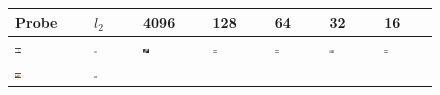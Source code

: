 \begin{figure}[t]
    \begin{center}
        \begin{tabu} to \textwidth {|X[c]|X[c]|X[c]X[c]X[c]X[c]X[c]|}
           \hline
            Probe & $l_2$ & 4096 & 128 & 64 & 32 & 16 \\ \hline \hline
            \includegraphics[width=0.1\textwidth]{images/ret_results/0/probe.png} & 
            \includegraphics[width=0.1\textwidth]{images/ret_results/0/l2.png} & 
            \includegraphics[width=0.1\textwidth]{images/ret_results/0/4096.png} &
            \includegraphics[width=0.1\textwidth]{images/ret_results/0/128.png} &
            \includegraphics[width=0.1\textwidth]{images/ret_results/0/64.png} & 
            \includegraphics[width=0.1\textwidth]{images/ret_results/0/32.png} & 
            \includegraphics[width=0.1\textwidth]{images/ret_results/0/16.png} \\
            \includegraphics[width=0.1\textwidth]{images/ret_results/1/probe.png} & 
            \includegraphics[width=0.1\textwidth]{images/ret_results/1/l2.png} &

\end{tabu}
\end{center}
\end{figure}
